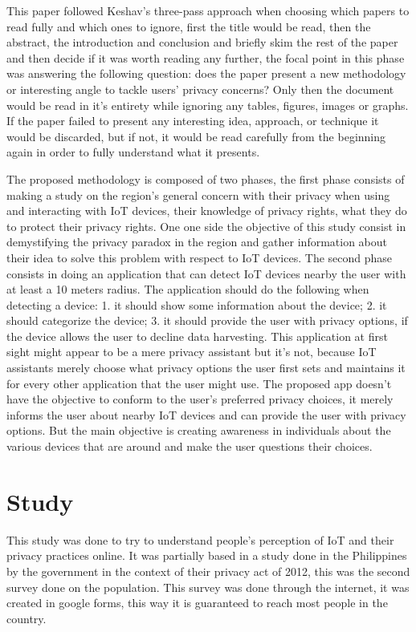 \documentclass[conference]{IEEEtran}
\begin{document}
This paper followed Keshav's three-pass approach \cite{KeshavHow} when choosing which
papers to read fully and which ones to ignore, first the title would be read,
then the abstract, the introduction and conclusion and briefly skim the rest of the paper
and then decide if it was worth reading any further, the focal point in this
phase was answering the following question: does the paper present a new
methodology or interesting angle to tackle users' privacy concerns? Only then
the document would be read in it's entirety while ignoring any tables, figures,
images or graphs. If the paper failed to present any interesting idea, approach,
or technique it would be discarded, but if not, it would be read carefully
from the beginning again in order to fully understand what it presents.

The proposed methodology is composed of two phases, the first phase consists
of making a study on the region's general concern with their privacy when using
and interacting with IoT devices, their knowledge of privacy rights, what they
do to protect their privacy rights. One one side the objective of this study
consist in demystifying the privacy paradox in the region and gather information
about their idea to solve this problem with respect to IoT devices. The second
phase consists in doing an application that can detect IoT devices nearby the
user with at least a 10 meters radius. The application should do the following
when detecting a device:
1. it should show some information about the device;
2. it should categorize the device;
3. it should provide the user with privacy options, if the device allows the
user to decline data harvesting.
This application at first sight might appear to be a mere privacy assistant but
it's not, because IoT assistants merely choose what privacy options the user
first sets and maintains it for every other application that the user might use.
The proposed app doesn't have the objective to conform to the user's preferred
privacy choices, it merely informs the user about nearby IoT devices and can
provide the user with privacy options. But the main objective is creating
awareness in individuals about the various devices that are around and make the
user questions their choices.

\section{Study}

This study was done to try to understand people's perception of IoT and their
privacy practices online. It was partially based in a study done in the Philippines
by the government in the context of their privacy act of 2012, this was the second
survey done on the population. This survey was done through the internet, it
was created in google forms, this way it is guaranteed to reach most people in
the country.
\end{document}
